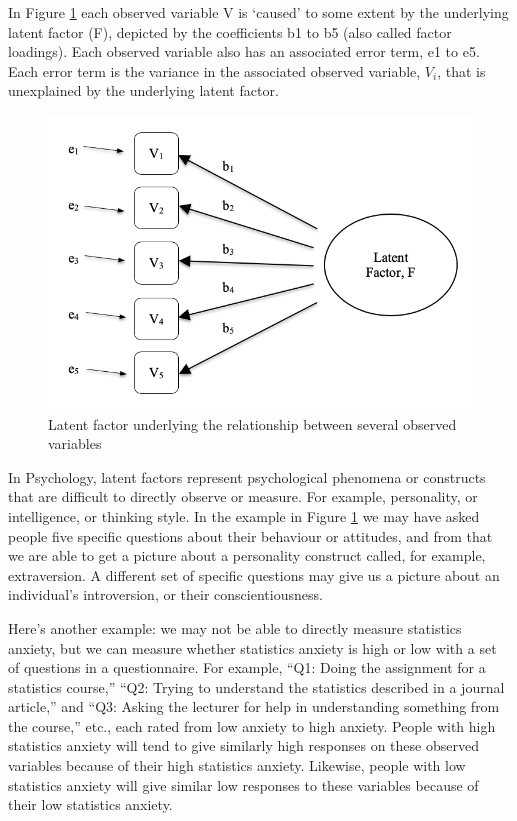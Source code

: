 \documentclass[
]{book}
\begin{document}
In Figure \ref{fig:fa1} each observed variable V is `caused' to some extent by the underlying latent factor (F), depicted by the coefficients b1 to b5 (also called factor loadings). Each observed variable also has an associated error term, e1 to e5. Each error term is the variance in the associated observed variable, \(V_i\), that is unexplained by the underlying latent factor.

\begin{figure}

{\centering \includegraphics[width=1\linewidth]{img/factoranalysis/fa1} 

}

\caption{Latent factor underlying the relationship between several observed variables}\label{fig:fa1}
\end{figure}

In Psychology, latent factors represent psychological phenomena or constructs that are difficult to directly observe or measure. For example, personality, or intelligence, or thinking style. In the example in Figure \ref{fig:fa1} we may have asked people five specific questions about their behaviour or attitudes, and from that we are able to get a picture about a personality construct called, for example, extraversion. A different set of specific questions may give us a picture about an individual's introversion, or their conscientiousness.

Here's another example: we may not be able to directly measure statistics anxiety, but we can measure whether statistics anxiety is high or low with a set of questions in a questionnaire. For example, ``Q1: Doing the assignment for a statistics course,'' ``Q2: Trying to understand the statistics described in a journal article,'' and ``Q3: Asking the lecturer for help in understanding something from the course,'' etc., each rated from low anxiety to high anxiety. People with high statistics anxiety will tend to give similarly high responses on these observed variables because of their high statistics anxiety. Likewise, people with low statistics anxiety will give similar low responses to these variables because of their low statistics anxiety.
\end{document}

